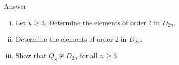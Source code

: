 \documentclass[a4paper]{article}
\begin{document}
Answer



\begin{questionbody}
\begin{enumerate}[(i)]
\item Let $n \ge 3$. Determine the elements of order 2 in $D_{2n}$.

\item Determine the elements of order 2 in $D_{2n}$.

\item Show that $Q_8 \not\cong D_{2n}$ for all $n \ge 3$.
\end{enumerate}
\end{questionbody}

\subsection{~} %
\subsection{~} %
\subsection{~} %

\end{document}
